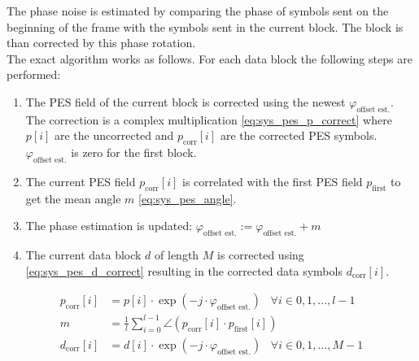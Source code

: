 The phase noise is estimated by comparing the phase of symbols
sent on the beginning of the frame with the symbols sent in
the current block. The block is than corrected by this phase
rotation. \\

The exact algorithm works as follows. For each data block
the following steps are performed:

\begin{enumerate}
\item The \gls{PES} field of the current block is corrected
  using the newest $\varphi_{\text{offset est.}}$.
  The correction is a complex multiplication \eqref{eq:sys_pes_p_correct}
  where $p[i]$ are the uncorrected and
  $p_{\text{corr}}[i]$ are the corrected \gls{PES} symbols.
  $\varphi_{\text{offset est.}}$ is zero for the first block.
\item The current \gls{PES} field $p_{\text{corr}}[i]$
  is correlated with the first \gls{PES} field $p_{\text{first}}$
  to get the mean angle $m$ \eqref{eq:sys_pes_angle}.
\item The phase estimation is updated:
  $\varphi_{\text{offset est.}} := \varphi_{\text{offset est.}} + m$
\item The current data block $d$ of length $M$ is corrected using
  \eqref{eq:sys_pes_d_correct} resulting in the corrected
  data symbols $d_{\text{corr}}[i]$.
\end{enumerate}

\begin{align}
  p_{\text{corr}}[i] &= p[i] \cdot \exp(-j \cdot \varphi_{\text{offset est.}})
  \;\;\; \forall i \in {0, 1, \dots, l-1}
  \label{eq:sys_pes_p_correct} \\
  m &= \frac{1}{l}
  \sum_{i=0}^{l-1} \angle(p_{\text{corr}}[i] \cdot p_{\text{first}}[i])
  \label{eq:sys_pes_angle} \\
  d_{\text{corr}}[i] &= d[i] \cdot \exp(-j \cdot \varphi_{\text{offset est.}})
  \;\;\; \forall i \in {0, 1, \dots, M-1}
  \label{eq:sys_pes_d_correct}
\end{align}

